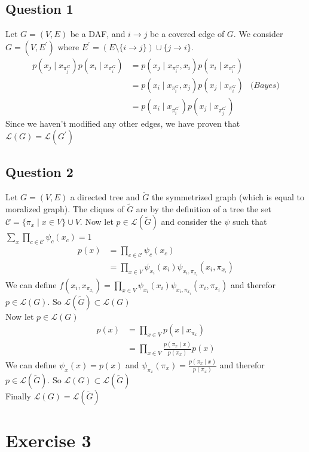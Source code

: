 \documentclass[a4paper]{article}
\begin{document}
\subsection{Question 1}
Let $G = (V,E)$ be a DAF, and $i\rightarrow j$ be a covered edge of $G$. We consider $G = (V,E^\prime)$ where $E^\prime = (E \setminus \{i \rightarrow j \}) \cup \{j \rightarrow i \}$.
\begin{align*}
p(x_j \mid x_{\pi_j^G})p(x_i \mid x_{\pi_i^G}) &= p(x_j \mid x_{\pi_i^G}, x_i)p(x_i \mid x_{\pi_i^G}) \\
&= p(x_i \mid x_{\pi_i^G}, x_j)p(x_j \mid x_{\pi_i^G}) &\textit{(Bayes)} \\
&= p(x_i \mid x_{\pi_i^{G^\prime}})p(x_j \mid x_{\pi_j^{G^\prime}})
\end{align*}
Since we haven't modified any other edges, we have proven that $\mathcal{L}(G) = \mathcal{L}(G^\prime)$
\subsection{Question 2}
Let $G=(V,E)$ a directed tree and $\tilde{G}$ the symmetrized graph (which is equal to moralized graph). The cliques of $\tilde{G}$ are by the definition of a tree the set $\mathcal{C} = \{ \pi_x \mid x \in V\} \cup V$. Now let $p \in \mathcal{L}(\tilde{G})$ and consider the $\psi$ such that $\sum_{x} \prod_{c\in \mathcal{C}} \psi_c(x_c) = 1$
\begin{align*}
p(x) &= \prod_{c \in \mathcal{C}}\psi_c(x_c) \\
&= \prod_{x \in V}\psi_{x_i}(x_i)\psi_{x_i, \pi_{x_i}}(x_i,\pi_{x_i})
\end{align*}
We can define $f(x_i,x_{\pi_{x_i}}) = \prod_{x \in V}\psi_{x_i}(x_i)\psi_{x_i, \pi_{x_i}}(x_i,\pi_{x_i})$ and therefor $p \in \mathcal{L}(G)$. So $\mathcal{L}(\tilde{G}) \subset \mathcal{L}(G)$ \\
Now let $p \in \mathcal{L}(G)$
\begin{align*}
p(x) &= \prod_{x \in V} p(x \mid x_{\pi_{x}}) \\
&= \prod_{x \in V} \frac{p(\pi_{x} \mid x)}{p(\pi_x)} p(x)
\end{align*}
We can define $\psi_{x}(x) = p(x)$ and $\psi_{\pi_x}(\pi_x) = \frac{p(\pi_{x} \mid x)}{p(\pi_x)}$ and therefor $p \in \mathcal{L}(\tilde{G})$. So $\mathcal{L}(G) \subset \mathcal{L}(\tilde{G})$ \\
Finally $\mathcal{L}(G) = \mathcal{L}(\tilde{G})$
\newpage
\section{Exercise 3}
\end{document}
